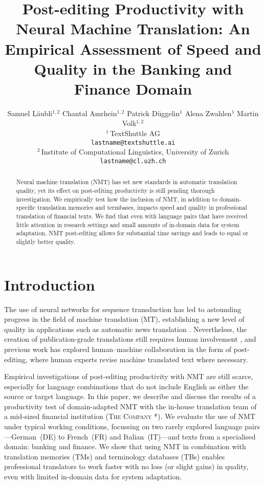 \documentclass[11pt]{article}
\title{Post-editing Productivity with Neural Machine Translation: An Empirical Assessment of Speed and Quality in the Banking and Finance Domain}
\author{}
\author{Samuel Läubli$^{1,2}$ 
    \quad Chantal Amrhein$^{1,2}$
    \quad Patrick Düggelin$^1$
    \quad Alena Zwahlen$^1$
    \quad Martin Volk$^{1,2}$ \bigskip\\
    $^1$\,TextShuttle AG \\
    \texttt{lastname@textshuttle.ai} \medskip\\
    $^2$\,Institute of Computational Linguistics, University of Zurich\\
    \texttt{lastname@cl.uzh.ch}\\}
\date{}
\newcommand{\thecompany}{\textsc{The Company} }
\begin{document}
\maketitle
\begin{abstract}
  Neural machine translation (NMT) has set new standards in automatic translation quality, yet its effect on post-editing productivity is still pending thorough investigation. We empirically test how the inclusion of NMT, in addition to domain-specific translation memories and termbases, impacts speed and quality in professional translation of financial texts. We find that even with language pairs that have received little attention in research settings and small amounts of in-domain data for system adaptation, NMT post-editing allows for substantial time savings and leads to equal or slightly better quality.
\end{abstract}

\section{Introduction}
\label{sec:Introduction}

The use of neural networks for sequence transduction \citep{KalchbrennerBlunsom2013,Sutskever2014,Bahdanau2015} has led to astounding progress in the field of machine translation (MT), establishing a new level of quality in applications such as automatic news translation \citep{Sennrich2016,Hassan2018}. Nevertheless, the creation of publication-grade translations still requires human involvement \citep{Toral2018}, and previous work has explored human--machine collaboration in the form of post-editing, where human experts revise machine translated text where necessary.

Empirical investigations of post-editing productivity with NMT are still scarce, especially for language combinations that do not include English as either the source or target language. In this paper, we describe and discuss the results of a productivity test of domain-adapted NMT with the in-house translation team of a mid-sized financial institution (\thecompany*). We evaluate the use of NMT under typical working conditions, focussing on two rarely explored language pairs---German~(DE) to French~(FR) and Italian~(IT)---and texts from a specialised domain: banking and finance. We show that using NMT in combination with translation memories (TMs) and terminology databases (TBs) enables professional translators to work faster with no loss (or slight gains) in quality, even with limited in-domain data for system adaptation.
\end{document}
